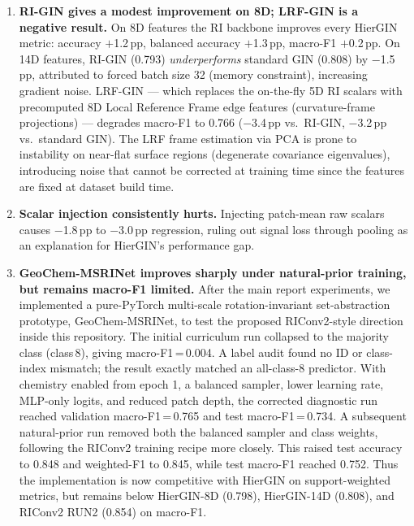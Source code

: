 \begin{enumerate}
  \item \textbf{RI-GIN gives a modest improvement on 8D; LRF-GIN is a negative result.}
        On 8D features the RI backbone improves every HierGIN metric:
        accuracy $+$1.2\,pp, balanced accuracy $+$1.3\,pp, macro-F1 $+$0.2\,pp.
        On 14D features, RI-GIN (0.793) \emph{underperforms} standard GIN (0.808) by $-$1.5\,pp,
        attributed to forced batch size 32 (memory constraint), increasing gradient noise.
        LRF-GIN --- which replaces the on-the-fly 5D RI scalars with precomputed
        8D Local Reference Frame edge features (curvature-frame projections) ---
        degrades macro-F1 to 0.766 ($-$3.4\,pp vs.\ RI-GIN, $-$3.2\,pp vs.\ standard GIN).
        The LRF frame estimation via PCA is prone to instability on near-flat surface
        regions (degenerate covariance eigenvalues), introducing noise that cannot be
        corrected at training time since the features are fixed at dataset build time.

  \item \textbf{Scalar injection consistently hurts.}
        Injecting patch-mean raw scalars causes $-$1.8\,pp to $-$3.0\,pp
        regression, ruling out signal loss through pooling as an explanation
        for HierGIN's performance gap.

  \item \textbf{GeoChem-MSRINet improves sharply under natural-prior training, but remains macro-F1 limited.}
        After the main report experiments, we implemented a pure-PyTorch
        multi-scale rotation-invariant set-abstraction prototype,
        GeoChem-MSRINet, to test the proposed RIConv2-style direction inside
        this repository.
        The initial curriculum run collapsed to the majority class
        (class\,8), giving macro-F1\,=\,0.004.
        A label audit found no ID or class-index mismatch; the result exactly
        matched an all-class-8 predictor.
        With chemistry enabled from epoch 1, a balanced sampler, lower learning
        rate, MLP-only logits, and reduced patch depth, the corrected diagnostic
        run reached validation macro-F1\,=\,0.765 and test macro-F1\,=\,0.734.
        A subsequent natural-prior run removed both the balanced sampler and
        class weights, following the RIConv2 training recipe more closely.
        This raised test accuracy to 0.848 and weighted-F1 to 0.845, while
        test macro-F1 reached 0.752.
        Thus the implementation is now competitive with HierGIN on
        support-weighted metrics, but remains below HierGIN-8D (0.798),
        HierGIN-14D (0.808), and RIConv2 RUN2 (0.854) on macro-F1.

\end{enumerate}

